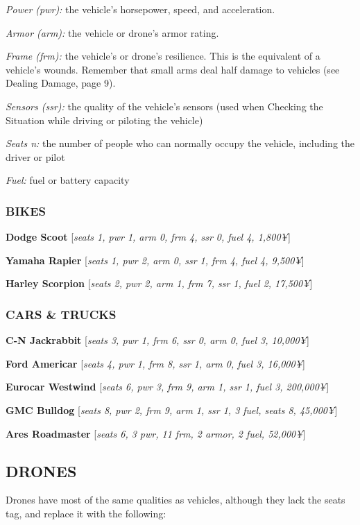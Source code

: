 \documentclass[oneside,10pt]{article}
\begin{document}
\begin{multicols}{2}
\begin{adjustwidth*}{.5cm}{.5cm}
\textit{Power (pwr):} the vehicle’s horsepower,
speed, and acceleration.

\textit{Armor (arm):} the vehicle or drone’s armor
rating.

\textit{Frame (frm):} the vehicle’s or drone’s resilience. This is the
equivalent of a vehicle’s wounds. Remember that small
arms deal half damage to vehicles (see Dealing Damage,
page 9).

\textit{Sensors (ssr):} the quality of the vehicle’s sensors (used
when Checking the Situation while driving or piloting the
vehicle)

\textit{Seats n:} the number of people who can normally occupy
the vehicle, including the driver or pilot

\textit{Fuel:} fuel or battery capacity
\end{adjustwidth*}

\subsubsection{BIKES}
\textbf{Dodge Scoot} [\textit{seats 1, pwr 1, arm 0, frm 4, ssr 0, fuel 4,
1,800¥}]

\textbf{Yamaha Rapier} [\textit{seats 1, pwr 2, arm 0, ssr 1, frm 4, fuel 4,
9,500¥}]

\textbf{Harley Scorpion} [\textit{seats 2, pwr 2, arm 1, frm 7, ssr 1, fuel 2,
17,500¥}]


\subsubsection{CARS \& TRUCKS}
\textbf{C-N Jackrabbit} [\textit{seats 3, pwr 1, frm 6, ssr 0, arm 0, fuel 3,
10,000¥}]

\textbf{Ford Americar} [\textit{seats 4, pwr 1, frm 8, ssr 1, arm 0, fuel 3,
16,000¥}]

\textbf{Eurocar Westwind} [\textit{seats 6, pwr 3, frm 9, arm 1, ssr 1, fuel
3, 200,000¥}]

\textbf{GMC Bulldog} [\textit{seats 8, pwr 2, frm 9, arm 1, ssr 1, 3 fuel, seats
8, 45,000¥}]

\textbf{Ares Roadmaster} [\textit{seats 6, 3 pwr, 11 frm, 2 armor, 2 fuel,
52,000¥}]


\subsection{DRONES}
Drones have most of the same qualities as vehicles, although
they lack the seats tag, and replace it with the
following:


\end{multicols}
\end{document}
